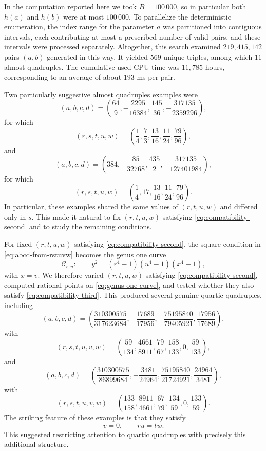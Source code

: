 \documentclass[11pt]{article}
\begin{document}
In the computation reported here we took $B=100\,000$, so in particular both $h(a)$ and $h(b)$ were at most $100\,000$. To parallelize the deterministic enumeration, the index range for the parameter $a$ was partitioned into contiguous intervals, each contributing at most a prescribed number of valid pairs, and these intervals were processed separately. Altogether, this search examined $219{,}415{,}142$ pairs $(a,b)$ generated in this way. It yielded $569$ unique triples, among which $11$ almost quadruples. The cumulative used CPU time was $11{,}785$ hours, corresponding to an average of about $193$ ms per pair.



Two particularly suggestive almost quadruples examples were
\[
(a,b,c,d)=\left(\frac{64}{9},-\frac{2295}{16384},\frac{145}{36},-\frac{317135}{2359296}\right),
\]
for which
\[
(r,s,t,u,w)=\left(\frac14,\frac73,\frac{13}{16},\frac{11}{24},\frac{79}{96}\right),
\]
and
\[
(a,b,c,d)=\left(384,-\frac{85}{32768},\frac{435}{2},-\frac{317135}{127401984}\right),
\]
for which
\[
(r,s,t,u,w)=\left(\frac14,17,\frac{13}{16},\frac{11}{24},\frac{79}{96}\right).
\]
In particular, these examples shared the same values of $(r,t,u,w)$ and differed only in $s$. This made it natural to fix $(r,t,u,w)$ satisfying \eqref{eq:compatibility-second} and to study the remaining conditions.

For fixed $(r,t,u,w)$ satisfying \eqref{eq:compatibility-second}, the square condition in \eqref{eq:abcd-from-rstuvw} becomes the genus one curve
\begin{equation}\label{eq:genus-one-curve}
\mathcal{C}_{r,u}:\qquad y^2=(r^4-1)(u^4-1)(x^4-1),
\end{equation}
with $x=v$. We therefore varied $(r,t,u,w)$ satisfying \eqref{eq:compatibility-second}, computed rational points on \eqref{eq:genus-one-curve}, and tested whether they also satisfy \eqref{eq:compatibility-third}. This produced several genuine quartic quadruples, including
\[
(a,b,c,d)=\left(\frac{310300575}{317623684},-\frac{17689}{17956},-\frac{75195840}{79405921},\frac{17956}{17689}\right),
\]
with
\[
(r,s,t,u,v,w)=\left(\frac{59}{134},\frac{4661}{8911},\frac{79}{67},\frac{158}{133},0,\frac{59}{133}\right),
\]
and
\[
(a,b,c,d)=\left(\frac{310300575}{86899684},-\frac{3481}{24964},\frac{75195840}{21724921},\frac{24964}{3481}\right),
\]
with
\[
(r,s,t,u,v,w)=\left(\frac{133}{158},\frac{8911}{4661},\frac{67}{79},\frac{134}{59},0,\frac{133}{59}\right).
\]
The striking feature of these examples is that they satisfy
\[
v=0,\qquad ru=tw.
\]
This suggested restricting attention to quartic quadruples with precisely this additional structure.
\end{document}
